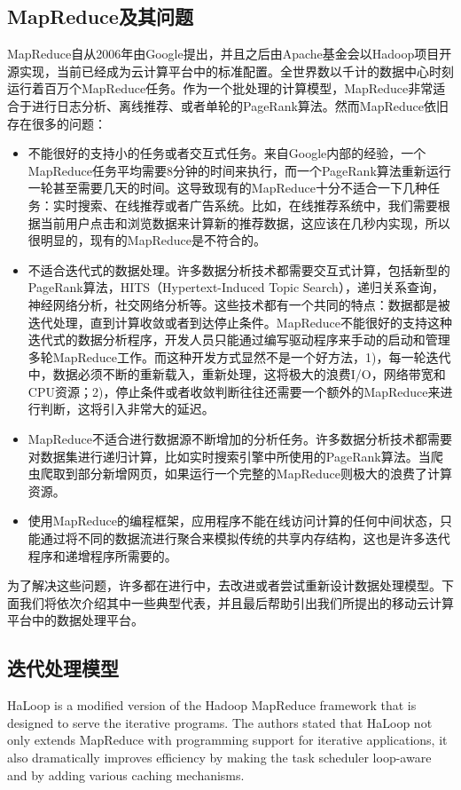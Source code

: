 \subsection{MapReduce及其问题}
MapReduce自从2006年由Google提出，并且之后由Apache基金会以Hadoop项目开源实现，当前已经成为云计算平台中的标准配置。全世界数以千计的数据中心时刻运行着百万个MapReduce任务。作为一个批处理的计算模型，MapReduce非常适合于进行日志分析、离线推荐、或者单轮的PageRank算法。然而MapReduce依旧存在很多的问题：
\begin{itemize}
\item 不能很好的支持小的任务或者交互式任务。来自Google内部的经验，一个MapReduce任务平均需要8分钟的时间来执行，而一个PageRank算法重新运行一轮甚至需要几天的时间。这导致现有的MapReduce十分不适合一下几种任务：实时搜索、在线推荐或者广告系统。比如，在线推荐系统中，我们需要根据当前用户点击和浏览数据来计算新的推荐数据，这应该在几秒内实现，所以很明显的，现有的MapReduce是不符合的。
\item 不适合迭代式的数据处理。许多数据分析技术都需要交互式计算，包括新型的PageRank算法，HITS（Hypertext-Induced Topic Search），递归关系查询，神经网络分析，社交网络分析等。这些技术都有一个共同的特点：数据都是被迭代处理，直到计算收敛或者到达停止条件。MapReduce不能很好的支持这种迭代式的数据分析程序，开发人员只能通过编写驱动程序来手动的启动和管理多轮MapReduce工作。而这种开发方式显然不是一个好方法，1)，每一轮迭代中，数据必须不断的重新载入，重新处理，这将极大的浪费I/O，网络带宽和CPU资源；2)，停止条件或者收敛判断往往还需要一个额外的MapReduce来进行判断，这将引入非常大的延迟。
\item	MapReduce不适合进行数据源不断增加的分析任务。许多数据分析技术都需要对数据集进行递归计算，比如实时搜索引擎中所使用的PageRank算法。当爬虫爬取到部分新增网页，如果运行一个完整的MapReduce则极大的浪费了计算资源。
\item 使用MapReduce的编程框架，应用程序不能在线访问计算的任何中间状态，只能通过将不同的数据流进行聚合来模拟传统的共享内存结构，这也是许多迭代程序和递增程序所需要的。
\end{itemize}

  为了解决这些问题，许多都在进行中，去改进或者尝试重新设计数据处理模型。下面我们将依次介绍其中一些典型代表，并且最后帮助引出我们所提出的移动云计算平台中的数据处理平台。

\subsection{迭代处理模型}
HaLoop is a modified version of the Hadoop MapReduce framework that is designed to serve the iterative programs. The authors stated that HaLoop not only extends MapReduce with programming support for iterative applications, it also dramatically improves efficiency by making the task scheduler loop-aware and by adding various caching mechanisms.


